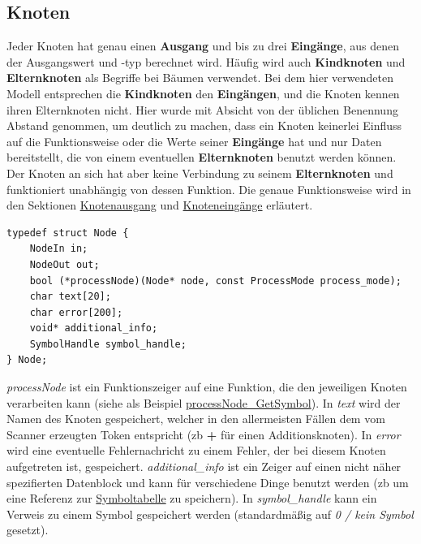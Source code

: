 \documentclass[oneside]{ausarbeitung}
\begin{document}
\subsection{Knoten}
\label{sub:node}
Jeder Knoten hat genau einen \textbf{Ausgang} und bis zu drei \textbf{Eingänge}, aus denen der Ausgangswert und -typ berechnet wird. Häufig wird auch \textbf{Kindknoten} und \textbf{Elternknoten} als Begriffe bei Bäumen verwendet. Bei dem hier verwendeten Modell entsprechen die \textbf{Kindknoten} den \textbf{Eingängen}, und die Knoten kennen ihren Elternknoten nicht. Hier wurde mit Absicht von der üblichen Benennung Abstand genommen, um deutlich zu machen, dass ein Knoten keinerlei Einfluss auf die Funktionsweise oder die Werte seiner \textbf{Eingänge} hat und nur Daten bereitstellt, die von einem eventuellen \textbf{Elternknoten} benutzt werden können. Der Knoten an sich hat aber keine Verbindung zu seinem \textbf{Elternknoten} und funktioniert unabhängig von dessen Funktion. Die genaue Funktionsweise wird in den Sektionen \hyperref[sub:node_out]{Knotenausgang} und \hyperref[sub:node_in]{Knoteneingänge} erläutert.

\begin{lstlisting}[label={lst:Node}, caption={Node}]
typedef struct Node {
    NodeIn in; 
    NodeOut out;
    bool (*processNode)(Node* node, const ProcessMode process_mode);
    char text[20];
    char error[200];
    void* additional_info;
    SymbolHandle symbol_handle;
} Node;
\end{lstlisting}

\textit{processNode} ist ein Funktionszeiger auf eine Funktion, die den jeweiligen Knoten verarbeiten kann (siehe als Beispiel \hyperref[lst:processNode]{processNode\_GetSymbol}). In \textit{text} wird der Namen des Knoten gespeichert, welcher in den allermeisten Fällen dem vom Scanner erzeugten Token entspricht (\ac{zb} \textbf{+} für einen Additionsknoten). In \textit{error} wird eine eventuelle Fehlernachricht zu einem Fehler, der bei diesem Knoten aufgetreten ist, gespeichert. \textit{additional\_info} ist ein Zeiger auf einen nicht näher spezifierten Datenblock und kann für verschiedene Dinge benutzt werden (\ac{zb} um eine Referenz zur \hyperref[sub:impl_symtab]{Symboltabelle} zu speichern). In \textit{symbol\_handle} kann ein Verweis zu einem Symbol gespeichert werden (standardmäßig auf \textit{0 / kein Symbol} gesetzt).
\end{document}
